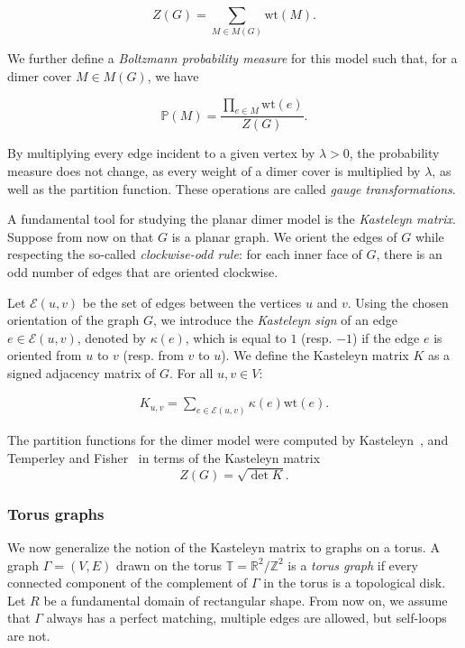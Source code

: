\documentclass[12pt,a4paper]{article}
\theoremstyle{definition}
\def\wt{\mathrm {wt}}
\begin{document}
\[Z(G) = \sum_{M \in M(G)} \wt(M).\]

We further define a \emph{Boltzmann probability measure} for this model such that, for a dimer cover $M \in M(G)$, we have 

\[\mathbb{P}(M) = \frac{\prod_{e \in M} \wt(e)}{Z(G)}.\]

By multiplying every edge incident to a given vertex by $\lambda > 0$, the probability measure does not change, as every weight of a dimer cover is multiplied by $\lambda$, as well as the partition function. These operations are called \emph{gauge transformations}. 

A fundamental tool for studying the planar dimer model is the \emph{Kasteleyn matrix}. Suppose from now on that $G$ is a planar graph. We orient the edges of $G$ while respecting the so-called \emph{clockwise-odd rule}: for each inner face of $G$, there is an odd number of edges that are oriented clockwise. 

Let $\mathcal{E}(u,v)$ be the set of edges between the vertices $u$ and $v$. Using the chosen orientation of the graph $G$, we introduce the \emph{Kasteleyn sign} of an edge $e \in \mathcal{E}(u,v)$, denoted by $\kappa(e)$, which is equal to $1$ (resp. $-1$) if the edge $e$ is oriented from $u$ to $v$ (resp. from $v$ to $u$).  We define the Kasteleyn matrix $K$ as a signed adjacency matrix of $G$. For all $u,v \in V$:

\begin{align*}
K_{u,v} = \sum_{e \in \mathcal{E}(u,v)}\kappa(e) \wt(e).
\end{align*}

The partition functions for the dimer model were computed by Kasteleyn~\cite{Kasteleyn63}, and Temperley and Fisher~\cite{TemperleyFisher61} in terms of the Kasteleyn matrix
\[Z(G) = \sqrt{\det K}.\]

\subsubsection*{Torus graphs}

We now generalize the notion of the Kasteleyn matrix to graphs on a torus. A graph $\Gamma = (V, E)$ drawn on the torus $\mathbb{T} = \mathbb{R}^2/\mathbb{Z}^2$ is a \emph{torus graph} if every connected component of the complement of $\Gamma$ in the torus is a topological disk. Let $R$ be a fundamental domain of rectangular shape. From now on, we assume that $\Gamma$ always has a perfect matching, multiple edges are allowed, but self-loops are not.
\end{document}
